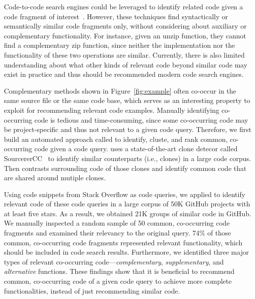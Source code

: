 
 
Code-to-code search engines could be leveraged to identify related code given a code 
fragment of interest~\cite{kim2018Facoy, krugle, searchcode}. 
However, these techniques find syntactically or semantically similar code fragments 
only, without considering about auxiliary or complementary functionality. 
For instance, given an unzip function, they cannot find a complementary zip function, since neither
the implementation nor the functionality of these two operations are similar. 
Currently,  there is also limited understanding about what other kinds of relevant code beyond similar code
may exist in practice and thus should be recommended modern code search engines. 



Complementary methods shown in Figure~\ref{fig:example} often co-occur in the same source file or the same code base, which serves as an interesting property to exploit for recommending relevant code examples.
Manually identifying co-occurring code is tedious and time-consuming, 
since some co-occurring code may be project-specific and thus not relevant to a given code query. 
Therefore, we first build an automated approach called {\tool} to identify, cluste, and rank common, 
co-occurring code given a code query.  
{\tool} uses a state-of-the-art clone detecor called SourcererCC~\cite{sajnani2016sourcerercc} to identify similar
counterparts (i.e., clones) in a large code corpus. Then {\tool} contrasts surrounding code of those clones 
and identify common code that are shared around mutiple clones.

Using code snippets from Stack Overflow
as code queries, we applied {\tool} to identify relevant code of these code queries in a large corpus of  50K GitHub projects with at least five stars. 
As a result, we obtained 21K groups of similar code in GitHub. We manually inspected a random sample of 50 common, co-occurring code fragments and examined their relevancy to the original query. 
74\% of those common, co-occurring code fragments represented relevant functionality, 
which should be included in code search results. 
Furthermore, we identified three major types of relevant co-occurring code---{\em complementary}, {\em supplementary}, and {\em alternative} functions. These findings show that it is beneficial to recommend common, co-occurring code of a given code query to achieve more complete functionalities, instead of just recommending similar code. 

